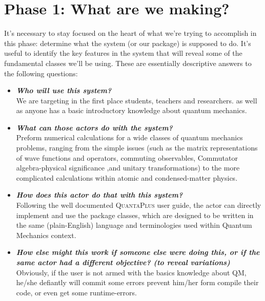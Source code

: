 \documentclass[10pt,a4paper]{article}
\begin{document}
\section{Phase 1: What are we making?}
It’s necessary to stay focused on the heart of what we’re trying to accomplish in this phase: determine what the system (or our package) is supposed to do. It's useful to identify the key features in the system that will reveal some of the fundamental classes we’ll be using. These are essentially descriptive answers to the following questions:
\begin{itemize}
	\item  \textit{\bf Who will use this system?}\\
	We are targeting in the first place students, teachers and researchers. as well as anyone has a basic introductory knowledge about quantum mechanics.
	\item \textit{\bf What can those actors do with the system?}\\
	Preform numerical calculations for a wide classes of quantum mechanics problems, ranging from the simple issues (such as the matrix representations of wave functions and operators, commuting observables, Commutator algebra-physical significance ,and unitary transformations) to the more complicated calculations within atomic and condensed-matter physics.

	
	\item \textit{\bf How does this actor do that with this system?}\\
	Following the well documented \textsc{QuantaPlus} user guide, the actor can directly implement and use the package classes, which are designed to be written in the same (plain-English) language and terminologies used within Quantum Mechanics context.      
	\item \textit{\bf How else might this work if someone else were doing this, or if the same actor had a different objective? (to reveal variations)}\\
	Obviously, if the user is not armed with the basics knowledge about QM, he/she defiantly will commit some errors prevent him/her form compile their code, or even get some runtime-errors.


\end{itemize}
\end{document}
